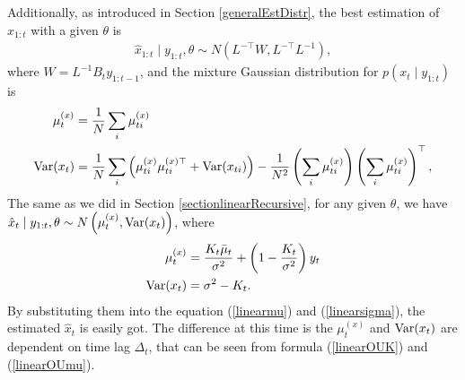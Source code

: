 Additionally, as introduced in Section \ref{generalEstDistr}, the best estimation of $x_{1:t}$ with a given $\theta$ is 
\begin{align*}
\hat{x}_{1:t} \mid y_{1:t},\theta \sim N\left(L^{-\top}W,L^{-\top}L^{-1}\right),
\end{align*}
where $W = L^{-1}B_{t}y_{1:t-1}$, and the mixture Gaussian distribution for $p(x_t \mid y_{1:t})$ is 
\begin{align}
\mu_t^{(x)} &= \frac{1}{N} \sum_i \mu_{ti}^{(x)}  \\
\mathrm{Var}(x_t) &= \frac{1}{N} \sum_i \left( \mu_{ti}^{(x)}  \mu_{ti}^{(x)\top} +\mathrm{Var}(x_{ti})\right) -\frac{1}{N^2} \left(  \sum_i  \mu_{ti}^{(x)} \right) \left( \sum_i \mu_{ti}^{(x)} \right) ^\top,
\end{align}
The same as we did in Section \ref{sectionlinearRecursive}, for any given $\theta$, we have $\hat{x}_{t}\mid y_{1:t},\theta \sim N\left( \mu_{t}^{(x)},\mathrm{Var}(x_t) \right)$, where
\begin{align*}
\mu_{t}^{(x)} &  =  \frac{K_{t}\bar{\mu}_{t}}{\sigma^2}+\left(1-\frac{K_{t}}{\sigma^2}\right)y_{t} \\
\mathrm{Var}(x_t)&= \sigma^2-K_{t}.
\end{align*}
By substituting them into the equation (\ref{linearmu}) and (\ref{linearsigma}), the estimated $\hat{x}_t$ is easily got. The difference at this time is the $\mu_{t}^{(x)}$ and $\mathrm{Var}(x_t)$ are dependent on time lag $\Delta_t$, that can be seen from formula (\ref{linearOUK}) and (\ref{linearOUmu}). 


